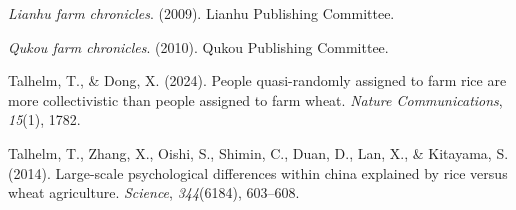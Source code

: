 \documentclass[
  man]{apa6}
\newlength{\cslhangindent}
\newlength{\cslentryspacingunit} %
\newenvironment{CSLReferences}[2] %
 {%
  \setlength{\parindent}{0pt}
  \ifodd #1
  \let\oldpar\par
  \def\par{\hangindent=\cslhangindent\oldpar}
  \fi
  \setlength{\parskip}{#2\cslentryspacingunit}
 }%
 {}
\begin{document}
\hypertarget{refs}{}
\begin{CSLReferences}{1}{0}
\leavevmode{}%
\emph{Lianhu farm chronicles}. (2009). Lianhu Publishing Committee.

\leavevmode{}%
\emph{Qukou farm chronicles}. (2010). Qukou Publishing Committee.

\leavevmode{}%
Talhelm, T., \& Dong, X. (2024). People quasi-randomly assigned to farm rice are more collectivistic than people assigned to farm wheat. \emph{Nature Communications}, \emph{15}(1), 1782.

\leavevmode{}%
Talhelm, T., Zhang, X., Oishi, S., Shimin, C., Duan, D., Lan, X., \& Kitayama, S. (2014). Large-scale psychological differences within china explained by rice versus wheat agriculture. \emph{Science}, \emph{344}(6184), 603--608.

\end{CSLReferences}
\end{document}
